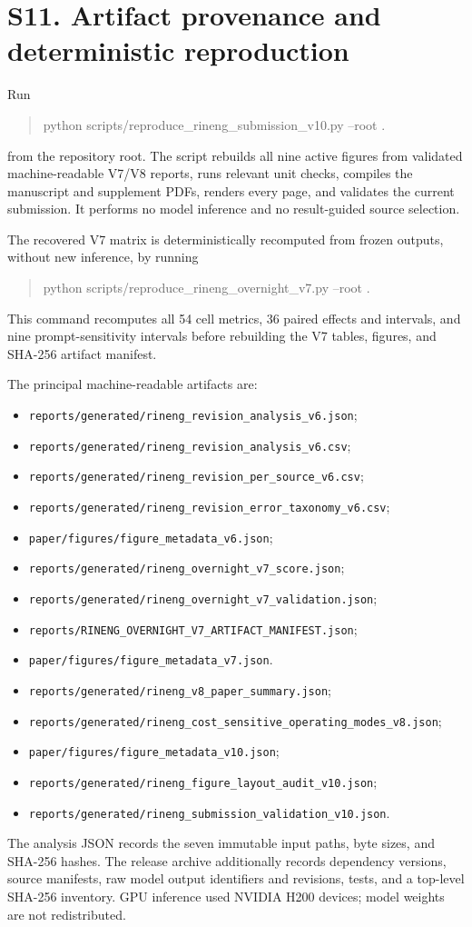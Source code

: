 \documentclass[11pt]{article}
\begin{document}
\section*{S11. Artifact provenance and deterministic reproduction}

Run
\begin{quote}\ttfamily
python scripts/reproduce\_rineng\_submission\_v10.py --root .
\end{quote}
from the repository root. The script rebuilds all nine active figures from
validated machine-readable V7/V8 reports, runs relevant unit checks, compiles
the manuscript and supplement PDFs, renders every page, and validates the
current submission. It performs no model inference and no result-guided source
selection.

The recovered V7 matrix is deterministically recomputed from frozen outputs,
without new inference, by running
\begin{quote}\ttfamily
python scripts/reproduce\_rineng\_overnight\_v7.py --root .
\end{quote}
This command recomputes all 54 cell metrics, 36 paired effects and intervals,
and nine prompt-sensitivity intervals before rebuilding the V7 tables,
figures, and SHA-256 artifact manifest.

The principal machine-readable artifacts are:
\begin{itemize}
\item \texttt{reports/generated/rineng\_revision\_analysis\_v6.json};
\item \texttt{reports/generated/rineng\_revision\_analysis\_v6.csv};
\item \texttt{reports/generated/rineng\_revision\_per\_source\_v6.csv};
\item \texttt{reports/generated/rineng\_revision\_error\_taxonomy\_v6.csv};
\item \texttt{paper/figures/figure\_metadata\_v6.json};
\item \texttt{reports/generated/rineng\_overnight\_v7\_score.json};
\item \texttt{reports/generated/rineng\_overnight\_v7\_validation.json};
\item \texttt{reports/RINENG\_OVERNIGHT\_V7\_ARTIFACT\_MANIFEST.json};
\item \texttt{paper/figures/figure\_metadata\_v7.json}.
\item \texttt{reports/generated/rineng\_v8\_paper\_summary.json};
\item \texttt{reports/generated/rineng\_cost\_sensitive\_operating\_modes\_v8.json};
\item \texttt{paper/figures/figure\_metadata\_v10.json};
\item \texttt{reports/generated/rineng\_figure\_layout\_audit\_v10.json};
\item \texttt{reports/generated/rineng\_submission\_validation\_v10.json}.
\end{itemize}
The analysis JSON records the seven immutable input paths, byte sizes, and
SHA-256 hashes. The release archive additionally records dependency versions,
source manifests, raw model output identifiers and revisions, tests, and a
top-level SHA-256 inventory. GPU inference used NVIDIA H200 devices; model
weights are not redistributed.
\end{document}
